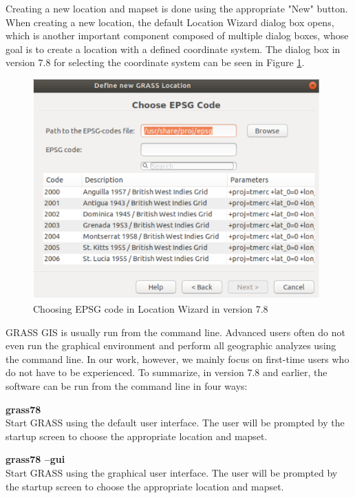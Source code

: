\documentclass[a4paper,10pt,twoside]{article}
\begin{document}
Creating a new location and mapset is done using the appropriate "New" button. When creating a new location, the default Location Wizard dialog box opens, which is another important component composed of multiple dialog boxes, whose goal is to create a location with a defined coordinate system. The dialog box in version 7.8 for selecting the coordinate system can be seen in Figure \ref{fig:loc_wizard_sour_pred}.

\vspace{0.3cm}
\begin{figure}[hbt!]
\begin{center}
\includegraphics[width=11cm]{pictures/loc_wizard_sour_pred.png} 
\caption[Choosing EPSG code in Location Wizard in version 7.8]{Choosing EPSG code in Location Wizard in version 7.8}
\label{fig:loc_wizard_sour_pred}
\end{center}
\end{figure}

\noindent GRASS GIS is usually run from the command line. Advanced users often do not even run the graphical environment and perform all geographic analyzes using the command line. In our work, however, we mainly focus on first-time users who do not have to be experienced. To summarize, in version 7.8 and earlier, the software can be run from the command line in four ways:

\noindent \textbf{grass78} \\
\noindent Start GRASS using the default user interface. The user will be prompted by the startup screen to choose the appropriate location and mapset.

\noindent \textbf{grass78 --gui}\\
\noindent Start GRASS using the graphical user interface. The user will be prompted by the startup screen to choose the appropriate location and mapset.
\end{document}
